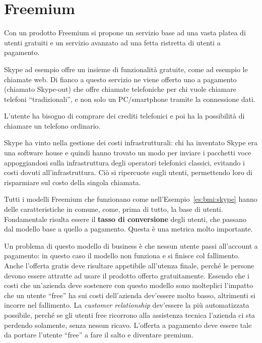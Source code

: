 \section{Freemium}

Con un prodotto Freemium si propone un servizio base ad una vasta platea di
utenti gratuiti e un servizio avanzato ad una fetta ristretta di utenti a
pagamento.

\begin{example}[Skype]\label{es:bmi:skype}
Skype ad esempio offre un insieme di funzionalità gratuite, come ad esempio le
chiamate web. Di fianco a questo servizio ne viene offerto uno a pagamento
(chiamato Skype-out) che offre chiamate telefoniche per chi vuole chiamare
telefoni ``tradizionali'', e non solo un PC/smartphone tramite la connessione
dati.

\noindent L'utente ha bisogno di comprare dei crediti telefonici e poi ha la
possibilità di chiamare un telefono ordinario.

\noindent Skype ha vinto nella gestione dei costi infrastrutturali:
chi ha inventato Skype era una software house e quindi hanno trovato un modo per
inviare i pacchetti voce appoggiandosi sulla infrastruttura degli operatori
telefonici classici, evitando i costi dovuti all'infrastruttura. Ciò si
ripercuote sugli utenti, permettendo loro di risparmiare sul costo della singola
chiamata.
\end{example}

\noindent Tutti i modelli Freemium che funzionano come
nell'Esempio~\ref{es:bmi:skype} hanno delle caratteristiche in comune, come,
prima di tutto, la base di utenti.
Fondamentale risulta essere il \textbf{tasso di conversione} degli utenti, che
passano dal modello base a quello a pagamento. Questa è una metrica molto
importante.

Un problema di questo modello di business è che nessun utente passi all'account
a pagamento: in questo caso il modello non funziona e si finisce col
fallimento. Anche l'offerta gratis deve risultare appetibile all'utenza finale,
perché le persone devono essere attratte ad usare il prodotto offerto
gratuitamente. Essendo che i costi che un'azienda deve sostenere con questo
modello sono molteplici l'impatto che un utente ``free'' ha sui costi
dell'azienda dev'essere molto basso, altrimenti si incorre nel fallimento.
La \textit{customer relationship} dev'essere la più automatizzata possibile,
perché se gli utenti free ricorrono alla assistenza tecnica l'azienda ci sta
perdendo solamente, senza nessun ricavo.
L'offerta a pagamento deve essere tale da portare l'utente ``free'' a fare il
salto e diventare premium.

